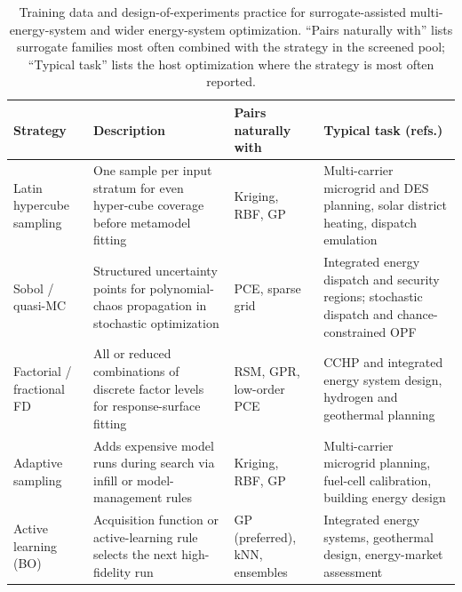 
\begin{table}[!t]
  \centering
  \footnotesize
  \caption{Training data and design-of-experiments practice for
  surrogate-assisted multi-energy-system and wider energy-system
  optimization. ``Pairs naturally with'' lists surrogate families most
  often combined with the strategy in the screened pool; ``Typical task''
  lists the host optimization where the strategy is most often reported.}
  \label{tab:T3-doe}
  \renewcommand{\arraystretch}{1.2}
  \begin{tabularx}{\textwidth}{@{}L{0.18\textwidth} L{0.30\textwidth} L{0.20\textwidth} L{0.26\textwidth}@{}}
    \toprule
    Strategy & Description & Pairs naturally with & Typical task (refs.) \\
    \midrule
    Latin hypercube sampling
      & One sample per input stratum for even hyper-cube coverage before metamodel fitting
      & Kriging, RBF, GP
      & Multi-carrier microgrid and DES planning, solar district heating, dispatch emulation
        \cite{Liu201914569,Seele20232480,Summ2025,Zhang2025__7,Hu2021671} \\
    Sobol / quasi-MC
      & Structured uncertainty points for polynomial-chaos propagation in stochastic optimization
      & PCE, sparse grid
      & Integrated energy dispatch and security regions; stochastic dispatch and chance-constrained OPF
        \cite{Dong2023,Jiang2026620,Gaitanis2026,Safta20172535,Lu201991827} \\
    Factorial / fractional FD
      & All or reduced combinations of discrete factor levels for response-surface fitting
      & RSM, GPR, low-order PCE
      & CCHP and integrated energy system design, hydrogen and geothermal planning
        \cite{Salahinezhad2025,Liu2025__4,Roy2023,Ahmad202451,Schulte2020} \\
    Adaptive sampling
      & Adds expensive model runs during search via infill or model-management rules
      & Kriging, RBF, GP
      & Multi-carrier microgrid planning, fuel-cell calibration, building energy design
        \cite{Liu201914569,Zhang2025__7,Aghaei Pour2022303,Granacher20221573,Lin2023} \\
    Active learning (BO)
      & Acquisition function or active-learning rule selects the next high-fidelity run
      & GP (preferred), kNN, ensembles
      & Integrated energy systems, geothermal design, energy-market assessment

\end{tabularx}
\end{table}
